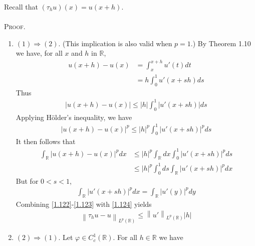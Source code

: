 \documentclass[a4paper,oneside]{article}
\numberwithin{equation}{section}
\begin{document}
Recall that $\left( {{\tau _h}u} \right)\left( x \right) = u\left( {x + h} \right)$.\\
\\
\textsc{Proof.} 
\begin{enumerate}
\item $\left( 1 \right) \Rightarrow \left( 2 \right)$. (This implication is also valid when $p=1$.) By Theorem 1.10 we have, for all $x$ and $h$ in $\mathbb{R}$,
\begin{align}
u\left( {x + h} \right) - u\left( x \right) &= \int_x^{x + h} {u'\left( t \right)dt} \\
 &= h\int_0^1 {u'\left( {x + sh} \right)ds} 
\end{align}
Thus
\begin{align}
\left| {u\left( {x + h} \right) - u\left( x \right)} \right| \le \left| h \right|\int_0^1 {\left| {u'\left( {x + sh} \right)} \right|ds} 
\end{align}
Applying H\"{o}lder's inequality, we have
\begin{align}
{\left| {u\left( {x + h} \right) - u\left( x \right)} \right|^p} \le {\left| h \right|^p}\int_0^1 {{{\left| {u'\left( {x + sh} \right)} \right|}^p}ds} 
\end{align}
It then follows that
\begin{align}
\label{1.122}
\int_{\mathbb{R}} {{{\left| {u\left( {x + h} \right) - u\left( x \right)} \right|}^p}dx}  &\le {\left| h \right|^p}\int_{\mathbb{R}} {dx\int_0^1 {{{\left| {u'\left( {x + sh} \right)} \right|}^p}ds} } \\
& \le {\left| h \right|^p}\int_0^1 {ds\int_{\mathbb{R}} {{{\left| {u'\left( {x + sh} \right)} \right|}^p}dx} }  \label{1.123}
\end{align}
But for $0<s<1$,
\begin{align}
\label{1.124}
\int_{\mathbb{R}} {{{\left| {u'\left( {x + sh} \right)} \right|}^p}dx}  = \int_{\mathbb{R}} {{{\left| {u'\left( y \right)} \right|}^p}dy} 
\end{align}
Combining \eqref{1.122}-\eqref{1.123} with \eqref{1.124} yields
\begin{align}
{\left\| {{\tau _h}u - u} \right\|_{{L^p}\left( \mathbb{R} \right)}} \le {\left\| {u'} \right\|_{{L^p}\left( \mathbb{R} \right)}}\left| h \right|
\end{align}
\item $\left( 2 \right) \Rightarrow \left( 1 \right)$. Let $\varphi  \in C_c^1\left( \mathbb{R} \right)$. For all $h\in \mathbb{R}$ we have
\begin{align}

\end{align}
\end{enumerate}
\end{document}
